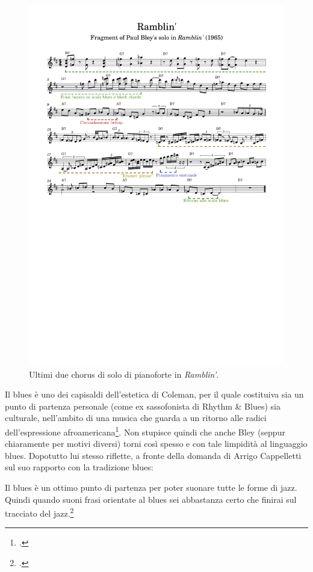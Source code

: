 \begin{figure}[h]
	\centering
	\includegraphics[clip,trim=1cm 13cm 1cm 3.5cm, width=\textwidth]{ramblin analysis.pdf}
	\caption{Ultimi due chorus di solo di pianoforte in \textit{Ramblin'}.}
	\label{fig:ramblin}
\end{figure}
Il blues è uno dei capisaldi dell'estetica di Coleman, per il quale costituiva sia un punto di partenza personale (come ex sassofonista di Rhythm \& Blues) sia culturale, nell'ambito di una musica che guarda a un ritorno alle radici dell'espressione afroamericana\footcite[38]{Cogswell1989}. Non stupisce quindi che anche Bley (seppur chiaramente per motivi diversi) torni così spesso e con tale limpidità al linguaggio blues. Dopotutto lui stesso riflette, a fronte della domanda di Arrigo Cappelletti sul suo rapporto con la tradizione blues:
\begin{fquote}
	Il blues è un ottimo punto di partenza per poter suonare tutte le forme di jazz. Quindi quando suoni frasi orientate al blues sei abbastanza certo che finirai sul tracciato del jazz.\footcite[135]{cappelletti}
\end{fquote}

